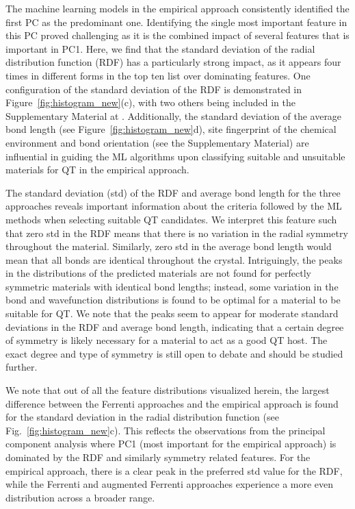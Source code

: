 \documentclass[superscriptaddress,unsortedaddress,
 amsmath,amssymb,
 aps,
]{revtex4-2}
\begin{document}
The machine learning models in the empirical approach consistently identified the first PC as the predominant one. Identifying the single most important feature in this PC proved challenging as it is the combined impact of several features that is important in PC1. 
Here, we find that the standard deviation of the radial distribution function (RDF) has a  particularly strong impact, as it appears four times in different forms in the top ten list over dominating features. One configuration of the standard deviation of the RDF is demonstrated in  Figure~\ref{fig:histogram_new}(c), with two others being included in the Supplementary Material at \cite{supplementary}.  Additionally, the standard deviation of the average bond length (see Figure~\ref{fig:histogram_new}d), site fingerprint of the chemical environment and bond orientation (see the Supplementary Material) are influential in guiding the ML algorithms upon classifying suitable and unsuitable materials for QT in the empirical approach. 

The standard deviation (std) of the RDF and average bond length for the three approaches reveals important information about the criteria followed by the ML methods when selecting suitable QT candidates. We interpret this feature such that zero std in the RDF means that there is no variation in the radial symmetry throughout the material. Similarly, zero std in the average bond length would mean that all bonds are identical throughout the crystal. Intriguingly, the peaks in the distributions of the predicted materials are not found for perfectly symmetric materials with identical bond lengths; instead, some variation in the bond and wavefunction distributions is found to be optimal for a material to be suitable for QT.  
We note that the peaks seem to appear for moderate standard deviations in the RDF and average bond length, indicating that a certain degree of symmetry is likely necessary for a material to act as a good QT host. The exact degree and type of symmetry is still open to debate and should be studied further. 

We note that out of all the feature distributions visualized herein, the largest difference between the Ferrenti approaches and the empirical approach is found for the standard deviation in the radial distribution function (see Fig.~\ref{fig:histogram_new}c). 
This reflects the observations from the principal component analysis where PC1 (most important for the empirical approach) is dominated by the RDF and similarly symmetry related features. For the empirical approach, there is a clear peak in the preferred std value for the RDF, while the Ferrenti and augmented Ferrenti approaches experience a more even distribution across a broader range. 
\end{document}
